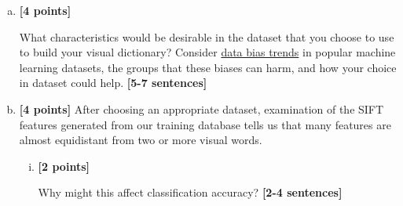 \begin{enumerate}[(a)]
    \item \textbf{[4 points]}
    \begin{tcolorbox}[colback=orange!5!white,colframe=orange!75!black]
      What characteristics would be desirable in the dataset that you choose to use to build your visual dictionary? Consider \href{https://www.telusinternational.com/articles/7-types-of-data-bias-in-machine-learning}{data bias trends} in popular machine learning datasets, the groups that these biases can harm, and how your choice in dataset could help. \textbf{[5-7 sentences]}
    \end{tcolorbox}


    \item 
     \textbf{[4 points]} After choosing an appropriate dataset, examination of the SIFT features generated from our training database tells us that many features are almost equidistant from two or more visual words.
    
    \begin{enumerate} [(i)]
    \item \textbf{[2 points]}
    \begin{tcolorbox}[colback=orange!5!white,colframe=orange!75!black]
      Why might this affect classification accuracy? \textbf{[2-4 sentences]}
    \end{tcolorbox}
    
    

\end{enumerate}
\end{enumerate}
